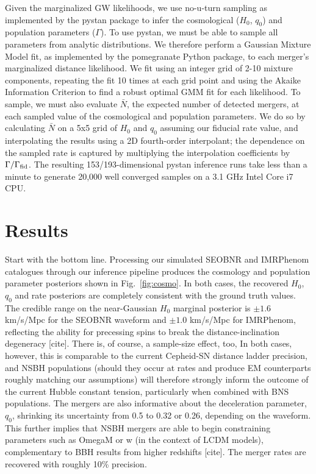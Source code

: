 \documentclass[twocolumn]{aastex63}
\newcommand{\nexp}{\bar{N}}
\begin{document}
Given the marginalized GW likelihoods, we use no-u-turn sampling as implemented by the pystan package to infer the cosmological ($H_0$, $q_0$) and population parameters ($\Gamma$). To use pystan, we must be able to sample all parameters from analytic distributions. We therefore perform a Gaussian Mixture Model fit, as implemented by the pomegranate Python package, to each merger's marginalized distance likelihood. We fit using an integer grid of 2-10 mixture components, repeating the fit 10 times at each grid point and using the Akaike Information Criterion to find a robust optimal GMM fit for each likelihood. To sample, we must also evaluate $\nexp$, the expected number of detected mergers, at each sampled value of the cosmological and population parameters. We do so by calculating $\nexp$ on a 5x5 grid of $H_0$ and $q_0$ assuming our fiducial rate value, and interpolating the results using a 2D fourth-order interpolant; the dependence on the sampled rate is captured by multiplying the interpolation coefficients by $\Gamma/\Gamma_{\rm fid}$. The resulting 153/193-dimensional pystan inference runs take less than a minute to generate 20,000 well converged samples on a 3.1 GHz Intel Core i7 CPU.

\section{Results} \label{sec:results}

Start with the bottom line. Processing our simulated SEOBNR and IMRPhenom catalogues through our inference pipeline produces the cosmology and population parameter posteriors shown in Fig.~\ref{fig:cosmo}. In both cases, the recovered $H_0$, $q_0$ and rate posteriors are completely consistent with the ground truth values. The credible range on the near-Gaussian $H_0$ marginal posterior is $\pm 1.6$ km/s/Mpc for the SEOBNR waveform and $\pm 1.0$ km/s/Mpc for IMRPhenom, reflecting the ability for precessing spins to break the distance-inclination degeneracy [cite]. There is, of course, a sample-size effect, too,  In both cases, however, this is comparable to the current Cepheid-SN distance ladder precision, and NSBH populations (should they occur at rates and produce EM counterparts roughly matching our assumptions) will therefore strongly inform the outcome of the current Hubble constant tension, particularly when combined with BNS populations. The mergers are also informative about the deceleration parameter, $q_0$, shrinking its uncertainty from 0.5 to 0.32 or 0.26, depending on the waveform. This further implies that NSBH mergers are able to begin constraining parameters such as OmegaM or w (in the context of LCDM models), complementary to BBH results from higher redshifts [cite]. The merger rates are recovered with roughly 10\% precision.
\end{document}
